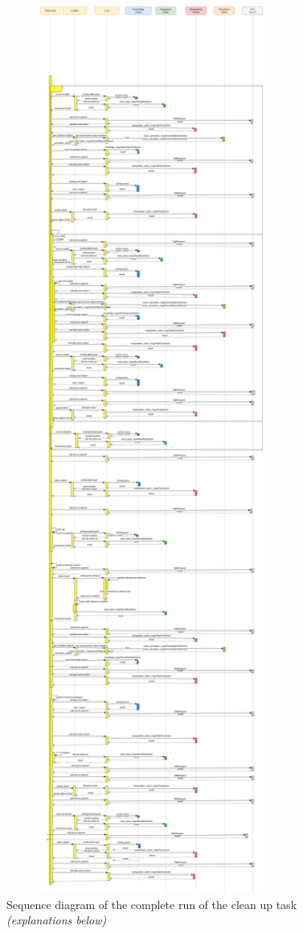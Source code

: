 \documentclass[main.tex]{subfiles}
\begin{document}
	  	\begin{figure}	
	  		\centering
	  		\includegraphics[width=0.85\textwidth]{pictures/diagramms/cleanup-sequence.png}
	  		\caption{Sequence diagram of the complete run of the clean up task \textit{(explanations below)}}
	  		\label{clean_up_seq_01}
	  	\end{figure}
	  	
\end{document}
